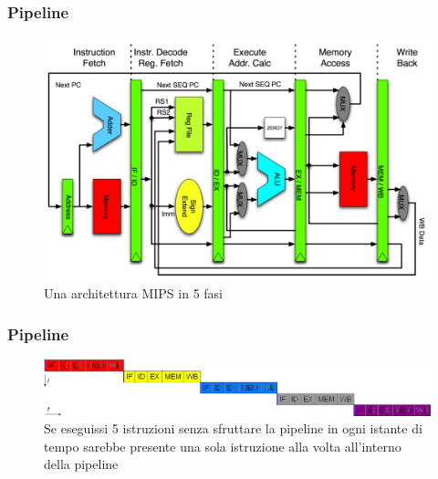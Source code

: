 \begin{frame}
	\frametitle{ Pipeline}

		\begin{figure}[!htbp]
			\centering 
			\includegraphics[width=0.82\linewidth]{images/7_pipeline/pipeline_mips_structure.png}
			\caption{Una architettura MIPS in 5 fasi}
			\label{fig:pipeline_mips_structure}
		\end{figure}

\end{frame}


\begin{frame}
	\frametitle{ Pipeline}

		\begin{figure}[!htbp]
			\centering 
			\includegraphics[width=1.0\linewidth]{images/7_pipeline/pipeline_no.png}
			\caption{Se eseguissi 5 istruzioni senza sfruttare la pipeline in ogni istante di tempo sarebbe presente una sola istruzione alla volta all'interno della pipeline}
		\end{figure}

\end{frame}


